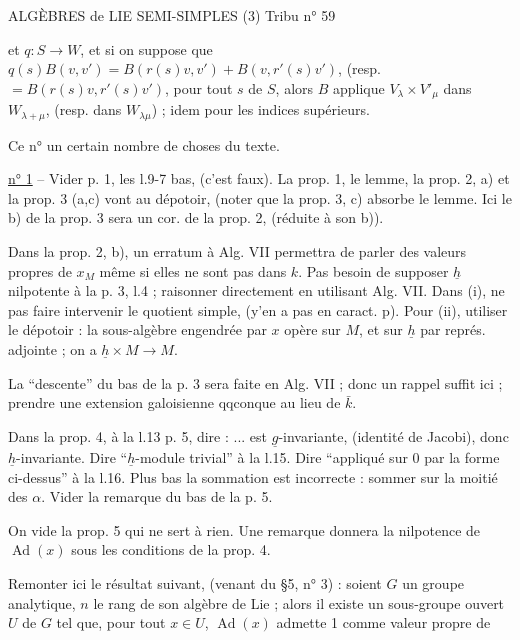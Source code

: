 ALGÈBRES de LIE SEMI-SIMPLES (3) \hfill Tribu n° 59

et $q:S\longrightarrow W$, et si on suppose que $q(s)B(v,v')=B(r(s)v,v')+B(v,r'(s)v')$, (resp. $=B(r(s)v,r'(s)v')$, pour tout $s$ de $S$, alors $B$ applique $V_\lambda\times V'_\mu$ dans $W_{\lambda+\mu}$, (resp. dans $W_{\lambda\mu}$) ; idem pour les indices supérieurs.

Ce n°  un certain nombre de choses du texte.

\uline{n° 1} -- Vider p. 1, les l.9-7 bas, (c'est faux). La prop. 1, le lemme, la prop. 2, a) et la prop. 3 (a,c) vont au dépotoir, (noter que la prop. 3, c) absorbe le lemme. Ici le b) de la prop. 3 sera un cor. de la prop. 2, (réduite à son b)).

Dans la prop. 2, b), un erratum à Alg. VII permettra de parler des valeurs propres de $x_M$ même si elles ne sont pas dans $k$. Pas besoin de supposer $\underline h$ nilpotente à la p. 3, l.4 ; raisonner directement en utilisant Alg. VII. Dans (i), ne pas faire intervenir le quotient simple, (y'en a pas en caract. p). Pour (ii), utiliser le dépotoir : la sous-algèbre engendrée par $x$ opère sur $M$, et sur $\underline h$ par représ. adjointe ; on a $\underline h\times M\longrightarrow M$.

La ``descente'' du bas de la p. 3 sera faite en Alg. VII ; donc un rappel suffit ici ; prendre une extension galoisienne qqconque au lieu de $\bar k$.

Dans la prop. 4, à la l.13 p. 5, dire : ... est $\underline g$-invariante, (identité de Jacobi), donc $\underline h$-invariante. Dire ``$\underline h$-module trivial'' à la l.15. Dire ``appliqué sur 0 par la forme ci-dessus'' à la l.16. Plus bas la sommation est incorrecte : sommer sur la moitié des $\alpha$. Vider la remarque du bas de la p. 5.

On vide la prop. 5 qui ne sert à rien. Une remarque donnera la nilpotence de $\operatorname{Ad}(x)$ sous les conditions de la prop. 4.

Remonter ici le résultat suivant, (venant du \S 5, n° 3) : soient $G$ un groupe analytique, $n$ le rang de son algèbre de Lie ; alors il existe un sous-groupe ouvert $U$ de $G$ tel que, pour tout $x\in U$, $\operatorname{Ad}(x)$ admette 1 comme valeur propre de
